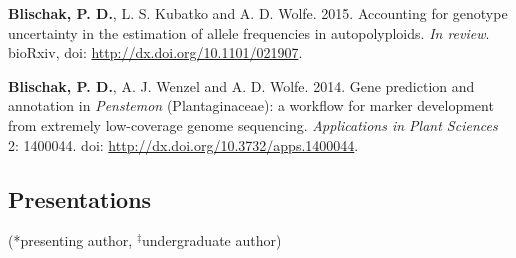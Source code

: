 \documentclass[]{article}
\begin{document}
\begin{etaremune}

\item
  \textbf{Blischak, P. D.}, L. S. Kubatko and A. D. Wolfe. 2015.
  Accounting for genotype uncertainty in the estimation of allele
  frequencies in autopolyploids. \emph{In review}. bioRxiv, doi:
  \href{http://dx.doi.org/10.1101/021907}{\url{http://dx.doi.org/10.1101/021907}}.
\item
  \textbf{Blischak, P. D.}, A. J. Wenzel and A. D. Wolfe. 2014. Gene
  prediction and annotation in \textit{Penstemon} (Plantaginaceae): a
  workflow for marker development from extremely low-coverage genome
  sequencing. \emph{Applications in Plant Sciences} 2: 1400044. doi:
  \href{http://dx.doi.org/10.3732/apps.1400044}{\url{http://dx.doi.org/10.3732/apps.1400044}}.
\end{etaremune}

\subsection{\texorpdfstring{\textbf{Presentations}}{Presentations}}\label{presentations}

(*presenting author, \(^{\ddagger}\)undergraduate author)
\end{document}
